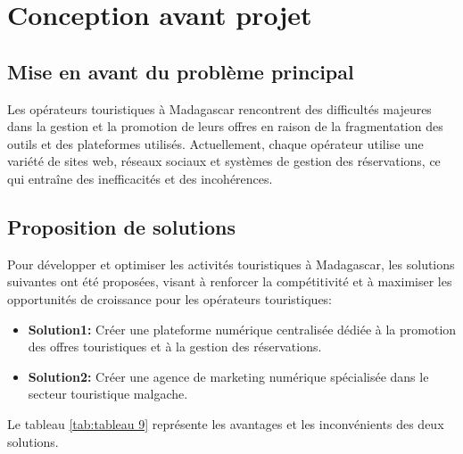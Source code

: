 \documentclass[12pt]{report}
\begin{document}
				\section{Conception avant projet}
				\subsection{Mise en avant du problème principal}
				
				\hspace{15pt} Les opérateurs touristiques à Madagascar rencontrent des difficultés majeures dans la gestion et la promotion de leurs offres en raison de la fragmentation des outils et des plateformes utilisés. Actuellement, chaque opérateur utilise une variété de sites web, réseaux sociaux et systèmes de gestion des réservations, ce qui entraîne des inefficacités et des incohérences.

				\subsection{Proposition de solutions}

				\hspace{15pt} Pour développer et optimiser les activités touristiques à Madagascar, les solutions suivantes ont été proposées, visant à renforcer la compétitivité et à maximiser les opportunités de croissance pour les opérateurs touristiques:

				\begin{itemize}
					\item \textbf{Solution1:} Créer une plateforme numérique centralisée dédiée à la promotion des offres touristiques et à la gestion des réservations.
					\item \textbf{Solution2:} Créer une agence de marketing numérique spécialisée dans le secteur touristique malgache.
				\end{itemize}

				Le tableau \ref{tab:tableau 9} représente les avantages et les inconvénients des deux solutions.
\end{document}
